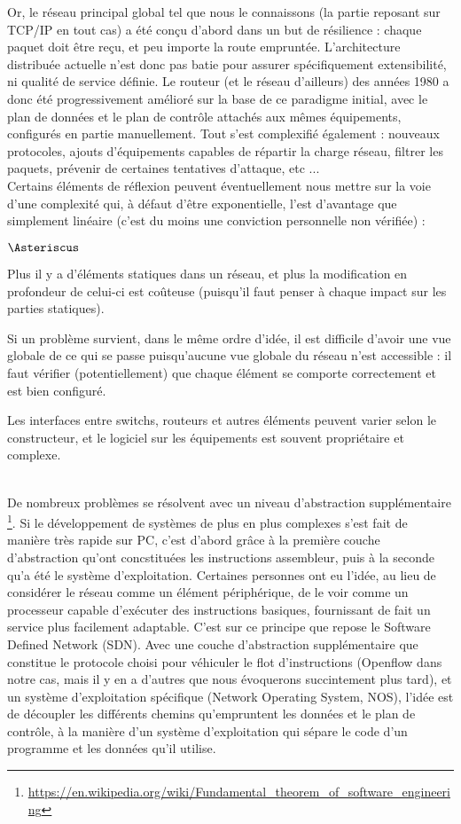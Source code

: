 Or, le réseau principal global tel que nous le connaissons (la partie reposant sur TCP/IP en tout cas) a été conçu d'abord dans un but de résilience : chaque paquet doit être reçu, et peu importe la route empruntée. L'architecture distribuée actuelle n'est donc pas batie pour assurer spécifiquement extensibilité, ni qualité de service définie. Le routeur (et le réseau d'ailleurs) des années 1980 a donc été progressivement amélioré sur la base de ce paradigme initial, avec le plan de données et le plan de contrôle attachés aux mêmes équipements, configurés en partie manuellement. Tout s'est complexifié également : nouveaux protocoles, ajouts d'équipements capables de répartir la charge réseau, filtrer les paquets, prévenir de certaines tentatives d'attaque, etc ...\\
Certains éléments de réflexion peuvent éventuellement nous mettre sur la voie d'une complexité qui, à défaut d'être exponentielle, l'est d'avantage que simplement linéaire (c'est du moins une conviction personnelle non vérifiée) :

\begin{list}{$\Asteriscus$}{}
\item Plus il y a d'éléments statiques dans un réseau, et plus la modification en profondeur de celui-ci est coûteuse (puisqu'il faut penser à chaque impact sur les parties statiques).
\item Si un problème survient, dans le même ordre d'idée, il est difficile d'avoir une vue globale de ce qui se passe puisqu'aucune vue globale du réseau n'est accessible : il faut vérifier (potentiellement) que chaque élément se comporte correctement et est bien configuré.
\item Les interfaces entre switchs, routeurs et autres éléments peuvent varier selon le constructeur, et le logiciel sur les équipements est souvent propriétaire et complexe.
\end{list}

~\\
De nombreux problèmes se résolvent avec un niveau d'abstraction supplémentaire \footnote{\label{indirection}\url{https://en.wikipedia.org/wiki/Fundamental_theorem_of_software_engineering}}. Si le développement de systèmes de plus en plus complexes s'est fait de manière très rapide sur PC, c'est d'abord grâce à la première couche d'abstraction qu'ont concstituées les instructions assembleur, puis à la seconde qu'a été le système d'exploitation. Certaines personnes ont eu l'idée, au lieu de considérer le réseau comme un élément périphérique, de le voir comme un processeur capable d'exécuter des instructions basiques, fournissant de fait un service plus facilement adaptable. C'est sur ce principe que repose le Software Defined Network (SDN). Avec une couche d'abstraction supplémentaire que constitue le protocole choisi pour véhiculer le flot d'instructions (Openflow dans notre cas, mais il y en a d'autres que nous évoquerons succintement plus tard), et un système d'exploitation spécifique (Network Operating System, NOS), l'idée est de découpler les différents chemins qu'empruntent les données et le plan de contrôle, à la manière d'un système d'exploitation qui sépare le code d'un programme et les données qu'il utilise.